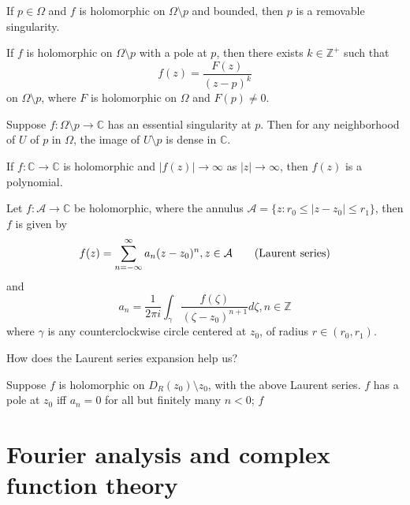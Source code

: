 \documentclass[openany]{book}
\newcommand{\C}{\mathbb{C}}
\begin{document}
\begin{thm}
    If $p\in\Omega$ and $f$ is holomorphic on $\Omega\setminus p$ and bounded, then $p$ is a removable singularity.
\end{thm}

\begin{prop}
    If $f$ is holomorphic on $\Omega\setminus p$ with a pole at $p$, then there exists $k\in\mathbb{Z}^+$ such that 
    \begin{equation*}
        f(z)=\frac{F(z)}{(z-p)^k}
    \end{equation*}
    on $\Omega\setminus p$, where $F$ is holomorphic on $\Omega$ and $F(p)\neq 0$.
\end{prop}


\begin{prop}
    Suppose $f:\Omega\setminus p\to\C$ has an essential singularity at $p$. Then for any neighborhood of $U$ of $p$ in $\Omega$, the image of $U\setminus p$ is dense in $\C$.
\end{prop}


\begin{prop}
    If $f:\C\to\C$ is holomorphic and $|f(z)|\to\infty$ as $|z|\to\infty$, then $f(z)$ is a polynomial.
\end{prop}

\begin{prop}
    Let $f:\mathcal{A}\to\C$ be holomorphic, where the annulus $\mathcal{A}=\{z: r_0\leq |z-z_0|\leq r_1\}$, then $f$ is given by 
    \begin{equation*}
        f(z)=\sum_{n=-\infty}^\infty a_n(z-z_0)^n, z\in\mathcal{A} \tag{\text{Laurent series}}
    \end{equation*}
    and 
    \begin{equation*}
        a_n=\frac{1}{2\pi i}\int_\gamma \frac{f(\zeta)}{(\zeta-z_0)^{n+1}}d\zeta, n\in\mathbb{Z}
    \end{equation*}
    where $\gamma$ is any counterclockwise circle centered at $z_0$, of radius $r\in(r_0,r_1)$. 
\end{prop}



How does the Laurent series expansion help us?
\begin{prop}
    Suppose $f$ is holomorphic on $D_R(z_0)\setminus z_0$, with the above Laurent series. $f$ has a pole at $z_0$ iff $a_n=0$ for all but finitely many $n<0$; $f$ 
\end{prop}


\chapter{Fourier analysis and complex function theory}
\end{document}
